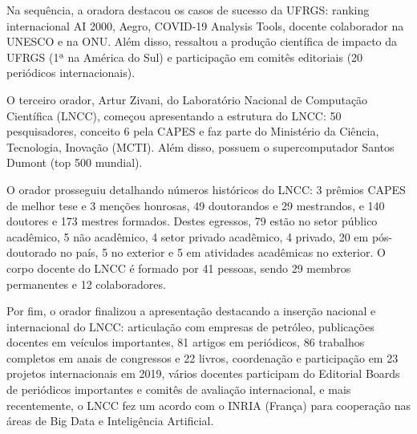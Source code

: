 Na sequência, a oradora destacou os casos de sucesso da UFRGS: ranking internacional AI 2000, Aegro, COVID-19 Analysis Tools, docente colaborador na UNESCO e na ONU. Além disso, ressaltou a produção científica de impacto da UFRGS (1ª na América do Sul) e participação em comitês editoriais (20 periódicos internacionais).

O terceiro orador, Artur Zivani, do Laboratório Nacional de Computação Científica (LNCC), começou apresentando a estrutura do LNCC: 50 pesquisadores, conceito 6 pela CAPES e faz parte do Ministério da Ciência, Tecnologia, Inovação (MCTI). Além disso, possuem o supercomputador Santos Dumont (top 500 mundial).

O orador prosseguiu detalhando números históricos do LNCC: 3 prêmios CAPES de melhor tese e 3 menções honrosas, 49 doutorandos e 29 mestrandos, e 140 doutores e 173 mestres formados. Destes egressos, 79 estão no setor público acadêmico, 5 não acadêmico, 4 setor privado acadêmico, 4 privado, 20 em pós-doutorado no país, 5 no exterior e 5 em atividades acadêmicas no exterior. O corpo docente do LNCC é formado por 41 pessoas, sendo 29 membros permanentes e 12 colaboradores.

Por fim, o orador finalizou a apresentação destacando a inserção nacional e internacional do LNCC: articulação com empresas de petróleo, publicações docentes em veículos importantes, 81 artigos em periódicos, 86 trabalhos completos em anais de congressos e 22 livros, coordenação e participação em 23 projetos internacionais em 2019, vários docentes participam do Editorial Boards de periódicos importantes e comitês de avaliação internacional, e mais recentemente, o LNCC fez um acordo com o INRIA (França) para cooperação nas áreas de Big Data e Inteligência Artificial.
